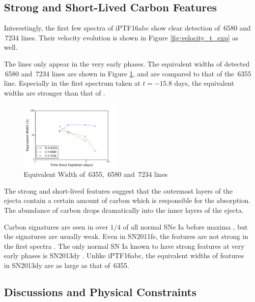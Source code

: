 \documentclass[twocolumn]{aastex61}
\begin{document}
\subsection{Strong and Short-Lived Carbon Features}
\label{sec:carbon}

Interestingly, the first few spectra of iPTF16abc show clear detection
of \,6580 and \,7234 lines. Their velocity
evolution is shown in Figure \ref{fig:velocity_t_exp} as well.

The  lines only appear in the very early phases. The
equivalent widths of detected \,6580 and \,7234
lines are shown in Figure \ref{fig:ew}, and are compared to that of
the \,6355 line. Especially in the first spectrum taken at
$t=-15.8$ days, the  equivalent widths are stronger than
that of .

\begin{figure}[!htb]
  \centering
  \includegraphics[width=0.45\textwidth]{EW.pdf}
  \caption{Equivalent Width of \,6355, \,6580 and
    \,7234 lines}
  \label{fig:ew}
\end{figure}

The strong and short-lived  features suggest that
the outermost layers of the ejecta contain a certain amount of
carbon which is responsible for the  absorption. The
abundance of carbon drops dramatically into the inner layers
of the ejecta.

Carbon signatures are seen in over $1/4$ of all normal SNe Ia before
maxima
\citep{2011ApJ...732...30P,2012MNRAS.425.1917S,2011ApJ...743...27T},
but the signatures are usually weak. Even in SN2011fe, the 
features are not strong in the first spectra
\citep{2012ApJ...752L..26P}.  The only normal SN Ia known to have
strong  features at very early phases is SN2013dy
\citep{2013ApJ...778L..15Z}. Unlike iPTF16abc, the equivalent widths
of  features in SN2013dy are as large as that of
\,6355.


\subsection{Discussions and Physical Constraints}
\label{sec:lc_energy}
\end{document}
